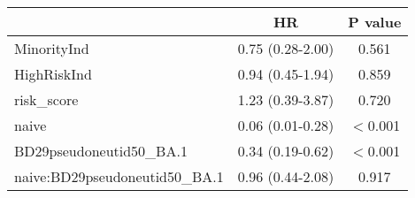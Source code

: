 \begin{tabular}{lcc}
   \hline  &HR& P value\\ 
\hline
MinorityInd & 0.75 (0.28-2.00) & 0.561 \\ 
  HighRiskInd & 0.94 (0.45-1.94) & 0.859 \\ 
  risk\_score & 1.23 (0.39-3.87) & 0.720 \\ 
  naive & 0.06 (0.01-0.28) & $<$0.001 \\ 
  BD29pseudoneutid50\_BA.1 & 0.34 (0.19-0.62) & $<$0.001 \\ 
  naive:BD29pseudoneutid50\_BA.1 & 0.96 (0.44-2.08) & 0.917 \\ 
   \hline
\end{tabular}
